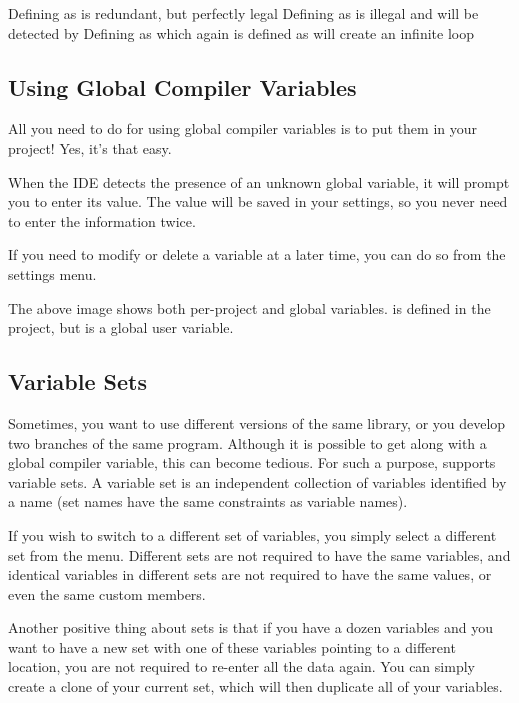 
Defining  as  is redundant, but perfectly legal
Defining  as  is illegal and will be detected by \codeblocks
Defining  as  which again is defined as  will create an infinite loop

\subsection{Using Global Compiler Variables}

All you need to do for using global compiler variables is to put them in your project! Yes, it's that easy.

When the IDE detects the presence of an unknown global variable, it will prompt you to enter its value. The value will be saved in your settings, so you never need to enter the information twice.

If you need to modify or delete a variable at a later time, you can do so from the settings menu.




The above image shows both per-project and global variables.  is defined in the project, but  is a global user variable.

\subsection{Variable Sets}

Sometimes, you want to use different versions of the same library, or you develop two branches of the same program. Although it is possible to get along with a global compiler variable, this can become tedious. For such a purpose, \codeblocks supports variable sets. A variable set is an independent collection of variables identified by a name (set names have the same constraints as variable names).

If you wish to switch to a different set of variables, you simply select a different set from the menu. Different sets are not required to have the same variables, and identical variables in different sets are not required to have the same values, or even the same custom members.

Another positive thing about sets is that if you have a dozen variables and you want to have a new set with one of these variables pointing to a different location, you are not required to re-enter all the data again. You can simply create a clone of your current set, which will then duplicate all of your variables.

